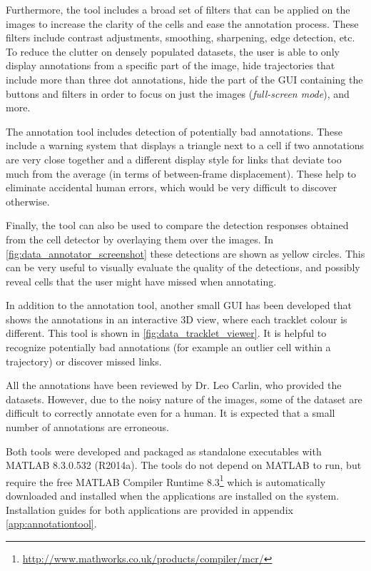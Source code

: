 						
		Furthermore, the tool includes a broad set of filters that can be applied on the images to increase the clarity of the cells and ease the annotation process. These filters include contrast adjustments, smoothing, sharpening, edge detection, etc. To reduce the clutter on densely populated datasets, the user is able to only display annotations from a specific part of the image, hide trajectories that include more than three dot annotations, hide the part of the GUI containing the buttons and filters in order to focus on just the images (\textit{full-screen mode}), and more.
		
		The annotation tool includes detection of potentially bad annotations. These include a warning system that displays a triangle next to a cell if two annotations are very close together and a different display style for links that deviate too much from the average (in terms of between-frame displacement). These help to eliminate accidental human errors, which would be very difficult to discover otherwise.


		Finally, the tool can also be used to compare the detection responses obtained from the cell detector by overlaying them over the images. In \cref{fig:data_annotator_screenshot} these detections are shown as yellow circles. This can be very useful to visually evaluate the quality of the detections, and possibly reveal cells that the user might have missed when annotating.
		

		In addition to the annotation tool, another small GUI has been developed that shows the annotations in an interactive 3D view, where each tracklet colour is different. This tool is shown in \cref{fig:data_tracklet_viewer}. It is helpful to recognize potentially bad annotations (for example an outlier cell within a trajectory) or discover missed links.
		
		All the annotations have been reviewed by Dr. Leo Carlin, who provided the datasets. However, due to the noisy nature of the images, some of the dataset are difficult to correctly annotate even for a human. It is expected that a small number of annotations are erroneous.
		
		Both tools were developed and packaged as standalone executables with MATLAB 8.3.0.532 (R2014a). The tools do not depend on MATLAB to run, but require the free MATLAB Compiler Runtime 8.3\footnote{\url{http://www.mathworks.co.uk/products/compiler/mcr/}} which is automatically downloaded and installed when the applications are installed on the system. Installation guides for both applications are provided in appendix \ref{app:annotationtool}.